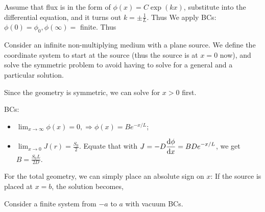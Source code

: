 \documentclass{school-22.211-notes}
\date{March 19, 2012}
\begin{document}
\maketitle


 \label{1g-1}

Assume that flux is in the form of $\phi(x) = C \exp(k x)$, substitute into the differential equation, and it turns out $ k = \pm \frac{1}{L}$. Thus 
We apply BCs: $\phi(0) = \phi_0, \phi(\infty) = $ finite. Thus



\clearpage
{}
Consider an infinite non-multiplying medium with a plane source. We define the coordinate system to start at the source (thus the source is at $x=0$ now), and solve the symmetric problem to avoid having to solve for a general and a particular solution. 

Since the geometry is symmetric, we can solve for $x>0$ first. 

BCs: 
\begin{itemize}
\item $\displaystyle \lim_{x \to \infty} \phi(x) = 0, \Rightarrow \phi(x) = B e^{-x/L}$; 
\item $\displaystyle \lim_{x\to 0} J(r)  = \frac{S_0}{2}$. Equate that with $\displaystyle J = -D \frac{\mathrm{d}\phi}{\mathrm{d}x} = B D e^{-x/L}$, we get $B = \frac{S_0 L}{2D}$. 
\end{itemize}
For the total geometry, we can simply place an absolute sign on $x$:
If the source is placed at $x=b$, the solution becomes,


\clearpage
{}
Consider a finite system from $-a$ to $a$ with vacuum BCs. 
\end{document}
